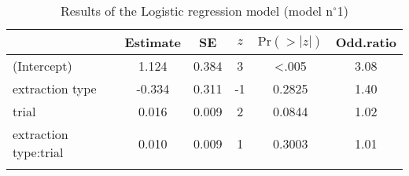 \begin{table}
\begin{tabular}{l S[table-format=-1.3] S[table-format=-1.3] S[table-format=-1] S[table-format=<1.4] S[table-format=1.2]}
  \lsptoprule
 & {Estimate} & {SE} & {$z$} & {$\text{Pr}(>|z|)$} & {Odd.ratio} \\ 
  \midrule
(Intercept) & 1.124 & 0.384 & 3 & <.005 & 3.08 \\ 
  extraction type & -0.334 & 0.311 & -1 & 0.2825 & 1.40 \\ 
  trial & 0.016 & 0.009 & 2 & 0.0844 & 1.02 \\ 
  extraction type:trial & 0.010 & 0.009 & 1 & 0.3003 & 1.01 \\ 
   \lspbottomrule
\end{tabular}
\caption{Results of the Logistic regression model (model n$^{\circ}$1)}
\label{tab:exp02-m1}
\end{table}
